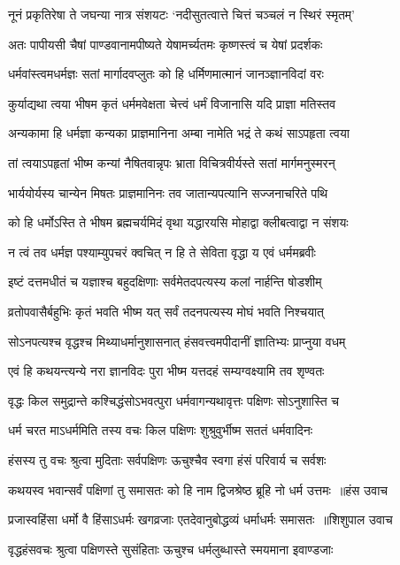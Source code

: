\twolineshloka
{नूनं प्रकृतिरेषा ते जघन्या नात्र संशयटः}
{`नदीसुतत्वात्ते चित्तं चञ्चलं न स्थिरं स्मृतम्'}


\twolineshloka
{अतः पापीयसी चैषां पाण्डवानामपीष्यते}
{येषामर्च्यतमः कृष्णस्त्वं च येषां प्रदर्शकः}


\twolineshloka
{धर्मवांस्त्वमधर्मज्ञः सतां मार्गादवप्लुतः}
{को हि धर्मिणमात्मानं जानञ्ज्ञानविदां वरः}


\twolineshloka
{कुर्याद्यथा त्वया भीषम कृतं धर्ममवेक्षता}
{चेत्त्वं धर्मं विजानासि यदि प्राज्ञा मतिस्तव}


\twolineshloka
{अन्यकामा हि धर्मज्ञा कन्यका प्राज्ञमानिना}
{अम्बा नामेति भद्रं ते कथं साऽपहृता त्वया}


\twolineshloka
{तां त्वयाऽपहृतां भीष्म कन्यां नैषितवान्नृपः}
{भ्राता विचित्रवीर्यस्ते सतां मार्गमनुस्मरन्}


\twolineshloka
{भार्ययोर्यस्य चान्येन मिषतः प्राज्ञमानिनः}
{तव जातान्यपत्यानि सज्जनाचरिते पथि}


\twolineshloka
{को हि धर्मोऽस्ति ते भीषम ब्रह्मचर्यमिदं वृथा}
{यद्धारयसि मोहाद्वा क्लीबत्वाद्वा न संशयः}


\twolineshloka
{न त्वं तव धर्मज्ञ पश्याम्युपचरं क्वचित्}
{न हि ते सेविता वृद्धा य एवं धर्ममब्रवीः}


\twolineshloka
{इष्टं दत्तमधीतं च यज्ञाश्च बहुदक्षिणाः}
{सर्वमेतदपत्यस्य कलां नार्हन्ति षोडशीम्}


\twolineshloka
{व्रतोपवासैर्बहुभिः कृतं भवति भीष्म यत्}
{सर्वं तदनपत्यस्य मोघं भवति निश्चयात्}


\twolineshloka
{सोऽनपत्यश्च वृद्धश्च मिथ्याधर्मानुशासनात्}
{हंसवत्त्वमपीदानीं ज्ञातिभ्यः प्राप्नुया वधम्}


\twolineshloka
{एवं हि कथयन्त्यन्ये नरा ज्ञानविदः पुरा}
{भीष्म यत्तदहं सम्यग्वक्ष्यामि तव शृण्वतः}


\twolineshloka
{वृद्धः किल समुद्रान्ते कश्चिद्धंसोऽभवत्पुरा}
{धर्मवागन्यथावृत्तः पक्षिणः सोऽनुशास्ति च}


\twolineshloka
{धर्म चरत माऽधर्ममिति तस्य वचः किल}
{पक्षिणः शुश्रुवुर्भीष्म सततं धर्मवादिनः}


\twolineshloka
{हंसस्य तु वचः श्रुत्वा मुदिताः सर्वपक्षिणः}
{ऊचुश्चैव स्वगा हंसं परिवार्य च सर्वशः}


\twolineshloka
{कथयस्व भवान्सर्वं पक्षिणां तु समासतः}
{को हि नाम द्विजश्रेष्ठ ब्रूहि नो धर्म उत्तमः ॥हंस उवाच}


\twolineshloka
{प्रजास्वहिंसा धर्मो वै हिंसाऽधर्मः खगव्रजाः}
{एतदेवानुबोद्धव्यं धर्माधर्मः समासतः ॥शिशुपाल उवाच}


\twolineshloka
{वृद्धहंसवचः श्रुत्वा पक्षिणस्ते सुसंहिताः}
{ऊचुश्च धर्मलुब्धास्ते स्मयमाना इवाण्डजाः}



